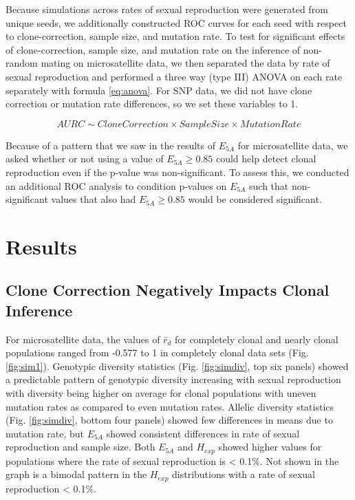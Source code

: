 \documentclass[double,11pt]{beavtex}
\begin{document}
  Because simulations across rates of sexual reproduction were generated
  from unique seeds, we additionally constructed ROC curves for each seed
  with respect to clone-correction, sample size, and mutation rate. To
  test for significant effects of clone-correction, sample size, and
  mutation rate on the inference of non-random mating on microsatellite
  data, we then separated the data by rate of sexual reproduction and
  performed a three way (type III) ANOVA on each rate separately with
  formula \eqref{eq:anova}. For SNP data, we did not have clone correction
  or mutation rate differences, so we set these variables to 1.
  
  \begin{equation}
  AURC \sim Clone Correction \times Sample Size \times Mutation Rate \label{eq:anova}
  \end{equation}
  
  Because of a pattern that we saw in the results of \(E_{5A}\) for
  microsatellite data, we asked whether or not using a value of
  \(E_{5A} \geq 0.85\) could help detect clonal reproduction even if the
  p-value was non-significant. To assess this, we conducted an additional
  ROC analysis to condition p-values on \(E_{5A}\) such that
  non-significant values that also had \(E_{5A} \geq 0.85\) would be
  considered significant.
  
  \section{Results}\label{results-1}
  
  \subsection{Clone Correction Negatively Impacts Clonal
  Inference}\label{clone-correction-negatively-impacts-clonal-inference}
  
  For microsatellite data, the values of \(\bar{r}_d\) for completely
  clonal and nearly clonal populations ranged from -0.577 to 1 in
  completely clonal data sets (Fig. \ref{fig:sim1}). Genotypic diversity
  statistics (Fig. \ref{fig:simdiv}, top six panels) showed a predictable
  pattern of genotypic diversity increasing with sexual reproduction with
  diversity being higher on average for clonal populations with uneven
  mutation rates as compared to even mutation rates. Allelic diversity
  statistics (Fig. \ref{fig:simdiv}, bottom four panels) showed few
  differences in means due to mutation rate, but \(E_{5A}\) showed
  consistent differences in rate of sexual reproduction and sample size.
  Both \(E_{5A}\) and \(H_{exp}\) showed higher values for populations
  where the rate of sexual reproduction is \textless{} 0.1\%. Not shown in
  the graph is a bimodal pattern in the \(H_{exp}\) distributions with a
  rate of sexual reproduction \textless{} 0.1\%.
  
\end{document}
